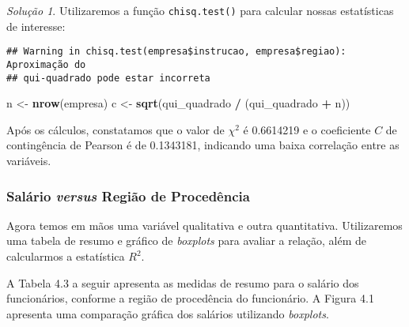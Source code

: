 \documentclass[
]{latex/krantz}
\newenvironment{Shaded}{\begin{snugshade}}{\end{snugshade}}
\newcommand{\DecValTok}[1]{\textcolor[rgb]{0.00,0.00,0.81}{#1}}
\newcommand{\FunctionTok}[1]{\textcolor[rgb]{0.13,0.29,0.53}{\textbf{#1}}}
\newcommand{\NormalTok}[1]{#1}
\newcommand{\OtherTok}[1]{\textcolor[rgb]{0.56,0.35,0.01}{#1}}
\newcommand{\SpecialCharTok}[1]{\textcolor[rgb]{0.81,0.36,0.00}{\textbf{#1}}}
\theoremstyle{definition}
\theoremstyle{definition}
\theoremstyle{definition}
\theoremstyle{definition}
\theoremstyle{remark}
\newtheorem*{solution}{Solução}
\begin{document}
\begin{solution}
Utilizaremos a função \texttt{chisq.test()} para calcular nossas estatísticas de interesse:

\begin{Shaded}
\end{Shaded}

\begin{verbatim}
## Warning in chisq.test(empresa$instrucao, empresa$regiao): Aproximação do
## qui-quadrado pode estar incorreta
\end{verbatim}

\begin{Shaded}
\begin{Highlighting}[]
\NormalTok{n }\OtherTok{\textless{}{-}} \FunctionTok{nrow}\NormalTok{(empresa)}
\NormalTok{c }\OtherTok{\textless{}{-}} \FunctionTok{sqrt}\NormalTok{(qui\_quadrado }\SpecialCharTok{/}\NormalTok{ (qui\_quadrado }\SpecialCharTok{+}\NormalTok{ n))}
\end{Highlighting}
\end{Shaded}

Após os cálculos, constatamos que o valor de \(\chi^2\) é 0.6614219 e o coeficiente \(C\) de contingência de Pearson é de 0.1343181, indicando uma baixa correlação entre as variáveis.

\hypertarget{saluxe1rio-versus-regiuxe3o-de-proceduxeancia}{%
\subsubsection*{\texorpdfstring{Salário \emph{versus} Região de Procedência}{Salário versus Região de Procedência}}\label{saluxe1rio-versus-regiuxe3o-de-proceduxeancia}}

Agora temos em mãos uma variável qualitativa e outra quantitativa. Utilizaremos uma tabela de resumo e gráfico de \emph{boxplots} para avaliar a relação, além de calcularmos a estatística \(R^2\).

A Tabela 4.3 a seguir apresenta as medidas de resumo para o salário dos funcionários, conforme a região de procedência do funcionário. A Figura 4.1 apresenta uma comparação gráfica dos salários utilizando \emph{boxplots}.


\end{solution}
\end{document}
